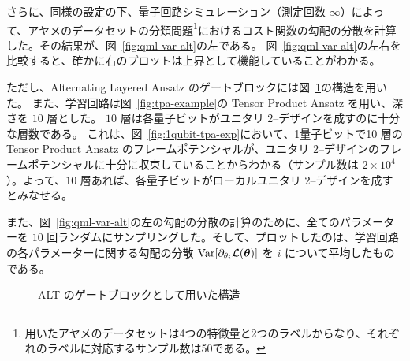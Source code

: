 さらに、同様の設定の下、量子回路シミュレーション（測定回数 $\infty$）によって、アヤメのデータセットの分類問題\footnote{用いたアヤメのデータセットは4つの特徴量と2つのラベルからなり、それぞれのラベルに対応するサンプル数は50である。}におけるコスト関数の勾配の分散を計算した。その結果が、図~\ref{fig:qml-var-alt}の左である。
図~\ref{fig:qml-var-alt}の左右を比較すると、確かに右のプロットは上界として機能していることがわかる。

ただし、Alternating Layered Ansatz のゲートブロックには図~\ref{fig:alt-example}の構造を用いた。
また、学習回路は図~\ref{fig:tpa-example}の Tensor Product Ansatz を用い、深さを $10$ 層とした。
$10$ 層は各量子ビットがユニタリ $2$--デザインを成すのに十分な層数である。
これは、図~\ref{fig:1qubit-tpa-exp}において、1量子ビットで10 層の Tensor Product Ansatz のフレームポテンシャルが、ユニタリ $2$--デザインのフレームポテンシャルに十分に収束していることからわかる（サンプル数は $2\times10^4$）。よって、$10$ 層あれば、各量子ビットがローカルユニタリ $2$--デザインを成すとみなせる。

また、図~\ref{fig:qml-var-alt}の左の勾配の分散の計算のために、全てのパラメーターを $10$ 回ランダムにサンプリングした。そして、プロットしたのは、学習回路の各パラメーターに関する勾配の分散 $\operatorname{Var}[\partial_{\theta_i} \mathcal{L}(\boldsymbol{\theta})]$ を $i$ について平均したものである。

\begin{figure}[H]
    \centering
    \caption{ALT のゲートブロックとして用いた構造}
    \label{fig:alt-example}
\end{figure}


